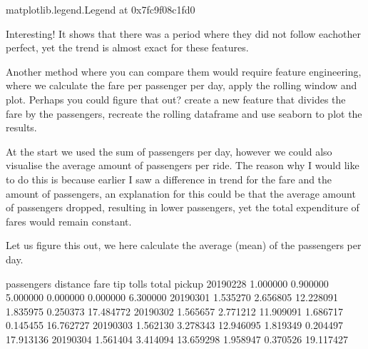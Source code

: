 \documentclass[letterpaper,10pt,english]{jupyterBook}
\begin{document}
\begin{sphinxVerbatim}[commandchars=\\\{\}]
\PYGZlt{}matplotlib.legend.Legend at 0x7fc9f08c1fd0\PYGZgt{}
\end{sphinxVerbatim}

\noindent{}

\sphinxAtStartPar
Interesting! It shows that there was a period where they did not follow eachother perfect, yet the trend is almost exact for these features.

\sphinxAtStartPar
Another method where you can compare them would require feature engineering, where we calculate the fare per passenger per day, apply the rolling window and plot.
Perhaps you could figure that out? create a new feature that divides the fare by the passengers, recreate the rolling dataframe and use seaborn to plot the results.

\sphinxAtStartPar
At the start we used the sum of passengers per day, however we could also visualise the average amount of passengers per ride.
The reason why I would like to do this is because earlier I saw a difference in trend for the fare and the amount of passengers, an explanation for this could be that the average amount of passengers dropped, resulting in lower passengers, yet the total expenditure of fares would remain constant.

\sphinxAtStartPar
Let us figure this out, we here calculate the average (mean) of the passengers per day.

\begin{sphinxVerbatim}[commandchars=\\\{\}]
  
\end{sphinxVerbatim}

\begin{sphinxVerbatim}[commandchars=\\\{\}]
            passengers  distance       fare       tip     tolls      total
pickup                                                                    
2019\PYGZhy{}02\PYGZhy{}28    1.000000  0.900000   5.000000  0.000000  0.000000   6.300000
2019\PYGZhy{}03\PYGZhy{}01    1.535270  2.656805  12.228091  1.835975  0.250373  17.484772
2019\PYGZhy{}03\PYGZhy{}02    1.565657  2.771212  11.909091  1.686717  0.145455  16.762727
2019\PYGZhy{}03\PYGZhy{}03    1.562130  3.278343  12.946095  1.819349  0.204497  17.913136
2019\PYGZhy{}03\PYGZhy{}04    1.561404  3.414094  13.659298  1.958947  0.370526  19.117427
\end{sphinxVerbatim}
\end{document}
